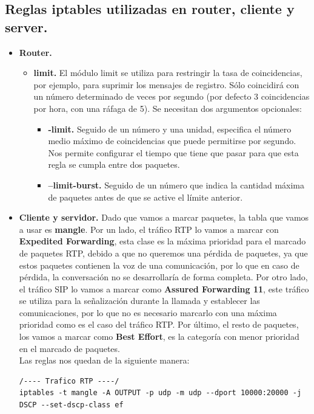 \documentclass[11pt]{article}
\begin{document}
\subsection{Reglas iptables utilizadas en router, cliente y server.}
\begin{itemize}
\item \textbf{Router.}
	\begin{itemize}
	En el caso del router hemos utilizado las reglas iptables que vienen dadas en el enunciado de la práctica. Estas son:
\begin{lstlisting}[style=C,numbers=none]		
iptables -t filter -A INPUT -m dscp --dscp 14 -m limit --limit 5/s --limit-burst 5 -j ACCEPT

iptables -t filter -A INPUT -m dscp --dscp 14 -j DROP		
\end{lstlisting}
	Donde los parámetros --limit y --limit-burst significan lo siguiente.
	\item \textbf{limit.} El módulo limit se utiliza para restringir la tasa de coincidencias, por ejemplo, para suprimir los mensajes de registro. Sólo coincidirá con un número determinado de veces por segundo (por defecto 3 coincidencias por hora, con una ráfaga de 5). Se necesitan dos argumentos opcionales: 
		\begin{itemize}
			\item \textbf{-limit.} Seguido de un número y una unidad, especifica el número medio máximo de coincidencias que puede permitirse por segundo. Nos permite configurar el tiempo que tiene que pasar para que esta regla se cumpla entre dos paquetes.
			\item \textbf{--limit-burst.} Seguido de un número que indica la cantidad máxima de paquetes antes de que se active el límite anterior. \\
		\end{itemize}
	\end{itemize}
	
\item \textbf{Cliente y servidor.}
	Dado que vamos a marcar paquetes, la tabla que vamos a usar es \textbf{mangle}. Por un lado, el tráfico RTP lo vamos a marcar con \textbf{Expedited Forwarding}, esta clase es la máxima prioridad para el marcado de paquetes RTP, debido a que no queremos una pérdida de paquetes, ya que estos paquetes contienen la voz de una comunicación, por lo que en caso de pérdida, la conversación no se desarrollaría de forma completa. Por otro lado, el tráfico SIP lo vamos a marcar como \textbf{Assured Forwarding 11}, este tráfico se utiliza para la señalización durante la llamada y establecer las comunicaciones, por lo que no es necesario marcarlo con una máxima prioridad como es el caso del tráfico RTP. Por último, el resto de paquetes, los vamos a marcar  como \textbf{Best Effort}, es la categoría con menor prioridad en el marcado de paquetes. \\
\newpage
Las reglas nos quedan de la siguiente manera:
\begin{lstlisting}[style=C,numbers=none]
/---- Trafico RTP ----/
iptables -t mangle -A OUTPUT -p udp -m udp --dport 10000:20000 -j DSCP --set-dscp-class ef


\end{lstlisting}
\end{itemize}
\end{document}
